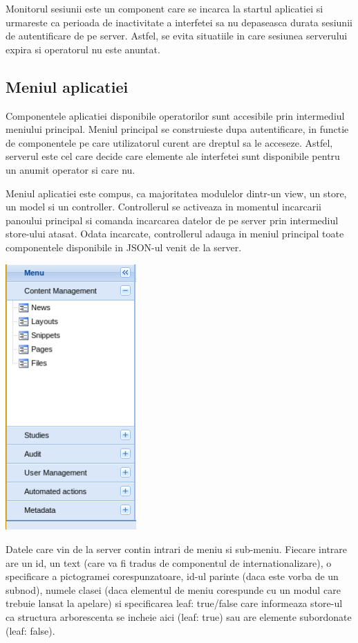 Monitorul sesiunii este un component care se incarca la startul aplicatiei si urmareste ca perioada de inactivitate a interfetei sa nu depaseasca durata sesiunii de autentificare de pe server. Astfel, se evita situatiile in care sesiunea serverului expira si operatorul nu este anuntat. 

\subsection{Meniul aplicatiei}

Componentele aplicatiei disponibile operatorilor sunt accesibile prin intermediul meniului principal. Meniul principal se construieste dupa autentificare, in functie de componentele pe care utilizatorul curent are dreptul sa le acceseze. Astfel, serverul este cel care decide care elemente ale interfetei sunt disponibile pentru un anumit operator si care nu. 

Meniul aplicatiei este compus, ca majoritatea modulelor dintr-un view, un store, un model si un controller. Controllerul se activeaza in momentul incarcarii panoului principal si comanda incarcarea datelor de pe server prin intermediul store-ului atasat. Odata incarcate, controllerul adauga in meniul principal toate componentele disponibile in JSON-ul venit de la server. 


\includegraphics[width=5cm]{img/menu}

Datele care vin de la server contin intrari de meniu si sub-meniu. Fiecare intrare are un id, un text (care va fi tradus de componentul de internationalizare), o specificare a pictogramei corespunzatoare, id-ul parinte (daca este vorba de un subnod), numele clasei (daca elementul de meniu corespunde cu un modul care trebuie lansat la apelare) si specificarea leaf: true/false care informeaza store-ul ca structura arborescenta se incheie aici (leaf: true) sau are elemente subordonate (leaf: false). 

